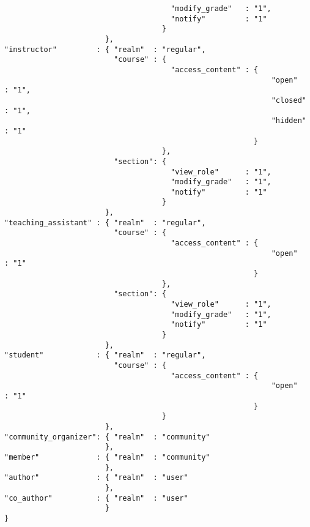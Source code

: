 \begin{verbatim}
                                      "modify_grade"   : "1",
                                      "notify"         : "1"
                                    }
                       },
"instructor"         : { "realm"  : "regular",
                         "course" : { 
                                      "access_content" : {
                                                             "open"               : "1",
                                                             "closed"             : "1",
                                                             "hidden"             : "1"
                                                         }
                                    },
                         "section": {
                                      "view_role"      : "1",
                                      "modify_grade"   : "1",
                                      "notify"         : "1"
                                    }
                       },
"teaching_assistant" : { "realm"  : "regular",
                         "course" : { 
                                      "access_content" : {
                                                             "open"               : "1"
                                                         }
                                    },
                         "section": {
                                      "view_role"      : "1",
                                      "modify_grade"   : "1",
                                      "notify"         : "1"
                                    }
                       },
"student"            : { "realm"  : "regular",
                         "course" : {
                                      "access_content" : {
                                                             "open"               : "1"
                                                         }
                                    }
                       },
"community_organizer": { "realm"  : "community"
                       },
"member"             : { "realm"  : "community"
                       },
"author"             : { "realm"  : "user"
                       },
"co_author"          : { "realm"  : "user"
                       }
}

\end{verbatim}
